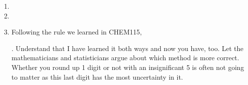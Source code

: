 \documentclass{article}
\begin{document}
\begin{enumerate}[start=1]
	\item {}
	\item {}
	\item Following the rule we learned in CHEM115,
	.
	Understand that I have learned it both ways and now you have, too. Let the mathematicians and statisticians argue about which method is more correct. Whether you round up 1 digit or not with an insignificant 5 is often not going to matter as this last digit has the most uncertainty in it.
\end{enumerate}
\end{document}
